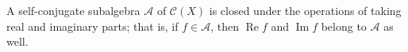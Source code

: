 A self-conjugate subalgebra $\mathcal{A}$ of $\mathcal{C}(X)$ is closed under the operations of taking real and imaginary parts; that is, if $f \in \mathcal{A}$, then $\operatorname{Re} f$ and $\operatorname{Im} f$ belong to $\mathcal{A}$ as well.

